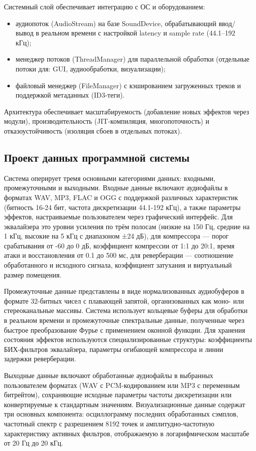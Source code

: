 Системный слой обеспечивает интеграцию с ОС и оборудованием:
\begin{itemize}
	\item аудиопоток (AudioStream) на базе SoundDevice, обрабатывающий ввод/вывод в реальном времени с настройкой latency и sample rate (44.1–192 кГц);
	\item менеджер потоков (ThreadManager) для параллельной обработки (отдельные потоки для: GUI, аудиообработки, визуализации);
	\item файловый менеджер (FileManager) с кэшированием загруженных треков и поддержкой метаданных (ID3-теги).
\end{itemize}

Архитектура обеспечивает масштабируемость (добавление новых эффектов через модули), производительность (JIT-компиляция, многопоточность) и отказоустойчивость (изоляция сбоев в отдельных потоках).

\subsection{Проект данных программной системы}

Система оперирует тремя основными категориями данных: входными, промежуточными и выходными. Входные данные включают аудиофайлы в форматах WAV, MP3, FLAC и OGG с поддержкой различных характеристик (битность 16-24 бит, частота дискретизации 44.1-192 кГц), а также параметры эффектов, настраиваемые пользователем через графический интерфейс. Для эквалайзера это уровни усиления по трём полосам (низкие на 150 Гц, средние на 1 кГц, высокие на 5 кГц с диапазоном ±24 дБ), для компрессора — порог срабатывания от -60 до 0 дБ, коэффициент компрессии от 1:1 до 20:1, время атаки и восстановления от 0.1 до 500 мс, для реверберации — соотношение обработанного и исходного сигнала, коэффициент затухания и виртуальный размер помещения.

Промежуточные данные представлены в виде нормализованных аудиобуферов в формате 32-битных чисел с плавающей запятой, организованных как моно- или стереоканальные массивы. Система использует кольцевые буферы для обработки в реальном времени и промежуточные спектральные данные, полученные через быстрое преобразование Фурье с применением оконной функции. Для хранения состояния эффектов используются специализированные структуры: коэффициенты БИХ-фильтров эквалайзера, параметры огибающей компрессора и линии задержки реверберации.

Выходные данные включают обработанные аудиофайлы в выбранных пользователем форматах (WAV с PCM-кодированием или MP3 с переменным битрейтом), сохраняющие исходные параметры частоты дискретизации или конвертируемые к стандартным значениям. Визуализационные данные содержат три основных компонента: осциллограмму последних обработанных сэмплов, частотный спектр с разрешением 8192 точек и амплитудно-частотную характеристику активных фильтров, отображаемую в логарифмическом масштабе от 20 Гц до 20 кГц.

